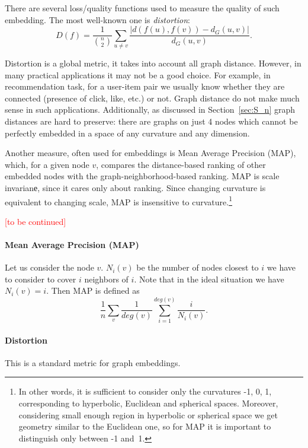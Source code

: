 \documentclass{article} %
\begin{document}
There are several loss/quality functions used to measure the quality of such embedding. The most well-known one is \textit{distortion}:
\[
D(f) = \frac{1}{\binom{n}{2}} \sum_{u \neq v}  \frac{|d(f(u),f(v)) - d_G(u,v)|}{d_G(u,v)}.
\]

Distortion is a global metric, it takes into account all graph distance. However, in many practical applications it may not be a good choice. For example, in recommendation task, for a user-item pair we usually know whether they are connected (presence of click, like, etc.) or not. Graph distance do not make much sense in such applications. Additionally, as discussed in Section~\ref{sec:S_n} graph distances are hard to preserve: there are graphs on just 4 nodes which cannot be perfectly embedded in a space of any curvature and any dimension. 

Another measure, often used for embeddings is Mean Average Precision (MAP), which, for a given node $v$, compares the distance-based ranking of other embedded nodes with the graph-neighborhood-based ranking. MAP is scale invarianе, since it cares only about ranking. Since changing curvature is equivalent to changing scale, MAP is insensitive to curvature.\footnote{In other words, it is sufficient to consider only the curvatures -1, 0, 1, corresponding to hyperbolic, Euclidean and spherical spaces. Moreover, considering small enough region in hyperbolic or spherical space we get geometry similar to the Euclidean one, so for MAP it is important to distinguish only between -1 and~1.}

\textcolor{red}{[to be continued]}

\iffalse

\paragraph{Mean Average Precision (MAP)}

Let us consider the node $v$. $N_i(v)$ be the number of nodes closest to $i$ we have to consider to cover $i$ neighbors of $i$. Note that in the ideal situation we have $N_i(v) = i$. Then MAP is defined as 
\[
\frac{1}{n} \sum_v \frac{1}{deg(v)} \sum_{i=1}^{deg(v)} \frac{i}{N_i(v)}. 
\]

\paragraph{Distortion} This is a standard metric for graph embeddings.
\end{document}
